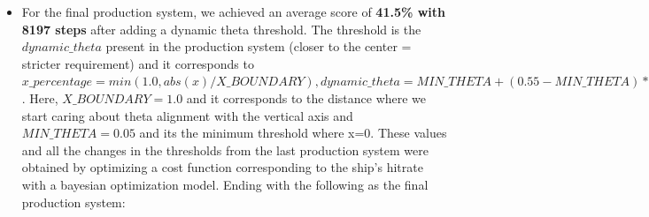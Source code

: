 \documentclass[a4paper, 12pt, fleqn]{report}
\begin{document}
\begin{itemize}
\begin{table}[h!]
\begin{tabular}{p{16cm}}
        \end{tabular}
    \end{table}
\newpage
    \item For the final production system, we achieved an average score of \textbf{41.5\% with 8197 steps } after adding a dynamic theta threshold. The threshold is the $dynamic\_theta$ present in the production system (closer to the center = stricter requirement) and it corresponds to $x\_percentage = min(1.0, abs(x) / X\_BOUNDARY), dynamic\_theta = MIN\_THETA + (0.55 - MIN\_THETA) * x\_percentage$. Here, $X\_BOUNDARY = 1.0$ and it corresponds to the distance where we start caring about theta alignment with the vertical axis and $MIN\_THETA = 0.05$ and its the minimum threshold where x=0. These values and all the changes in the thresholds from the last production system were obtained by optimizing a cost function corresponding to the ship's hitrate with a bayesian optimization model. Ending with the following as the final production system:


\end{itemize}
\end{document}
